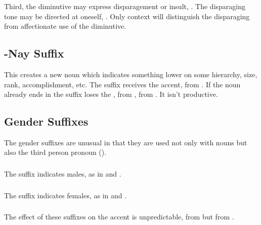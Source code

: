 \subsubsection{} Third, the diminutive may express disparagement or
insult,  .  The disparaging
tone may be directed at oneself,  .  Only context will distinguish
the disparaging from affectionate use of the diminutive.


\subsection{-Nay Suffix} This creates a new noun which indicates
something lower on some hierarchy, size, rank, accomplishment, etc.
The suffix receives the accent,   from  .  If the noun already ends in
 the suffix loses the , 
 from  , 
 from  .  It isn't productive.


\subsection{Gender Suffixes} The gender suffixes are unusual in that
they are used not only with nouns but also the third person pronoun
().  \label{lingop:suffix:gender}

\subsubsection{} The suffix  indicates males, as in
  and  .

\subsubsection{} The suffix  indicates females, as in
  and  .

\subsubsection{} The effect of these suffixes on the accent is
unpredictable,   from 
 but   from
 .


